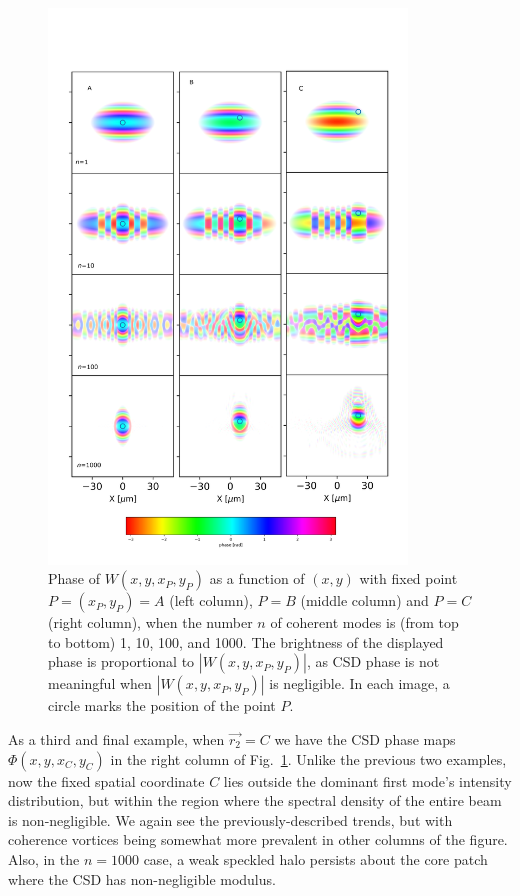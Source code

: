 \documentclass[%
 reprint,
 amsmath,amssymb,
 aps,
]{revtex4-1}
\begin{document}
\begin{figure}
\includegraphics[width=0.85\textwidth, trim=0 7mm 0 20mm,clip]{Figures/vx_id16a_ABC.png}
\caption{Phase of $W(x,y,x_P,y_P)$ as a function of $(x,y)$ with fixed point $P=(x_P,y_P)=A$ (left column), $P=B$ (middle column) and $P=C$ (right column), when the number $n$ of coherent modes is (from top to bottom) 1, 10, 100, and 1000. The brightness of the displayed phase is proportional to $|W(x,y,x_P,y_P)|$, as CSD phase is not meaningful when $|W(x,y,x_P,y_P)|$ is negligible. In each image, a circle marks the position of the point $P$.}
\label{pointP}%
\end{figure}

As a third and final example, when $\vec{r_2}=C$ we have the CSD phase maps $\Phi(x,y,x_C,y_C)$ in the right column of Fig.~\ref{pointP}.  Unlike the previous two examples, now the fixed spatial coordinate $C$ lies outside the dominant first mode's intensity distribution, but within the region where the spectral density of the entire beam is non-negligible.  We again see the previously-described trends, but with coherence vortices being somewhat more prevalent in other columns of the figure.  Also, in the $n=1000$ case, a weak speckled halo persists about the core patch where the CSD has non-negligible modulus.    
\end{document}
